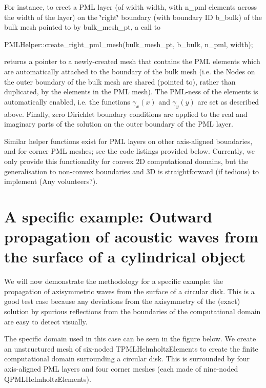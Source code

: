 For instance, to erect a P\+ML layer (of width {\ttfamily width}, with {\ttfamily n\+\_\+pml} elements across the width of the layer) on the \char`\"{}right\char`\"{} boundary (with boundary ID {\ttfamily b\+\_\+bulk}) of the bulk mesh pointed to by {\ttfamily bulk\+\_\+mesh\+\_\+pt}, a call to 
\begin{DoxyCode}
PMLHelper::create\_right\_pml\_mesh(bulk\_mesh\_pt, b\_bulk, n\_pml, width);
\end{DoxyCode}
 returns a pointer to a newly-\/created mesh that contains the P\+ML elements which are automatically attached to the boundary of the bulk mesh (i.\+e. the {\ttfamily Nodes} on the outer boundary of the bulk mesh are shared (pointed to), rather than duplicated, by the elements in the P\+ML mesh). The P\+M\+L-\/ness of the elements is automatically enabled, i.\+e. the functions $ \gamma_x(x) $ and $ \gamma_y(y) $ are set as described above. Finally, zero Dirichlet boundary conditions are applied to the real and imaginary parts of the solution on the outer boundary of the P\+ML layer.

Similar helper functions exist for P\+ML layers on other axis-\/aligned boundaries, and for corner P\+ML meshes; see the code listings provided below. Currently, we only provide this functionality for convex 2D computational domains, but the generalisation to non-\/convex boundaries and 3D is straightforward (if tedious) to implement (Any volunteers?).\hypertarget{index_scattering}{}\section{A specific example\+: Outward propagation of acoustic waves from the surface of a cylindrical object}\label{index_scattering}
We will now demonstrate the methodology for a specific example\+: the propagation of axisymmetric waves from the surface of a circular disk. This is a good test case because any deviations from the axisymmetry of the (exact) solution by spurious reflections from the boundaries of the computational domain are easy to detect visually.

The specific domain used in this case can be seen in the figure below. We create an unstructured mesh of six-\/noded {\ttfamily T\+P\+M\+L\+Helmholtz\+Elements} to create the finite computational domain surrounding a circular disk. This is surrounded by four axis-\/aligned P\+ML layers and four corner meshes (each made of nine-\/noded {\ttfamily Q\+P\+M\+L\+Helmholtz\+Elements}).

